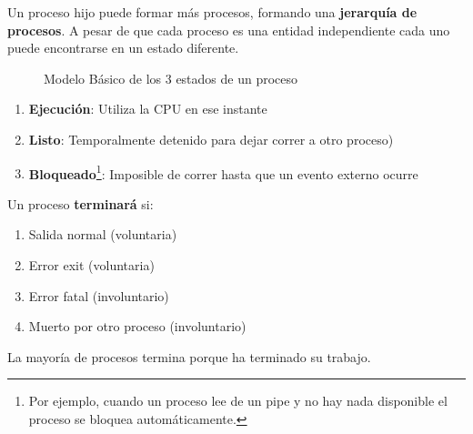 \documentclass[10pt,portrait, twocolumn]{article}
\begin{document}
Un proceso hijo puede formar más procesos, formando una \textbf{jerarquía de procesos}.  A pesar de que cada proceso es una entidad independiente cada uno puede encontrarse en un estado diferente.

\begin{figure}[h]
	\centering
      \caption{Modelo Básico de los 3 estados de un proceso}
  \end{figure}

	\begin{enumerate}
	\item \textbf{Ejecución}: Utiliza la CPU en ese instante
	\item \textbf{Listo}: Temporalmente detenido para dejar correr a otro proceso)
	\item \textbf{Bloqueado}\footnote{Por ejemplo, cuando un proceso lee de un pipe y no hay nada disponible el proceso se bloquea automáticamente.}: Imposible de correr hasta que un evento externo ocurre
	\end{enumerate}


Un proceso \textbf{terminará} si:

	\begin{enumerate}
		\item Salida normal (voluntaria)
		\item Error exit (voluntaria)
		\item Error fatal (involuntario)
		\item Muerto por otro proceso (involuntario)
	\end{enumerate}
	
La mayoría de procesos termina porque ha terminado su trabajo.
\end{document}
